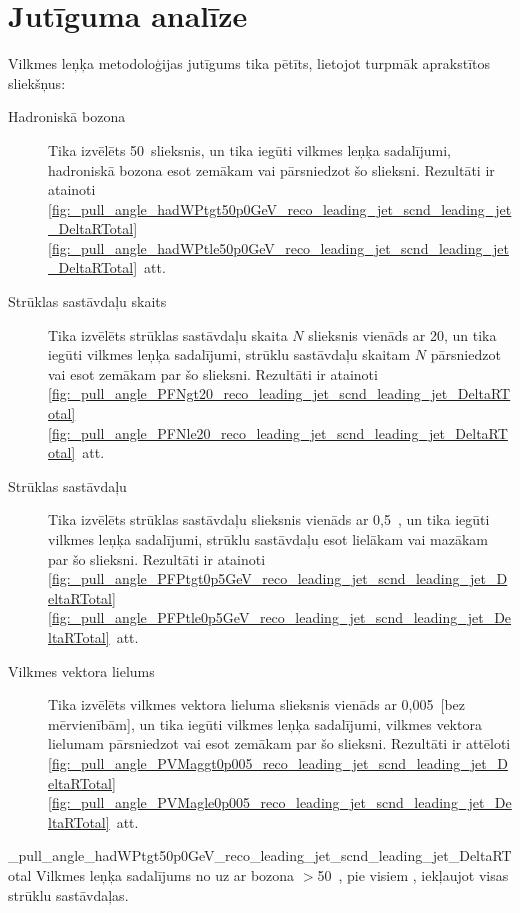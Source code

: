\section{Jutīguma analīze}

Vilkmes leņķa metodoloģijas jutīgums tika pētīts, lietojot turpmāk aprakstītos \gls{sliekšņus}:
\begin{description}
\item[Hadroniskā \PW bozona \pt] Tika izvēlēts 50~\GeV slieksnis, un tika iegūti vilkmes leņķa sadalījumi, hadroniskā \PW bozona \pt esot zemākam vai pārsniedzot šo slieksni. Rezultāti ir atainoti \ref{fig:_pull_angle_hadWPtgt50p0GeV_reco_leading_jet_scnd_leading_jet_DeltaRTotal}\textendash\ref{fig:_pull_angle_hadWPtle50p0GeV_reco_leading_jet_scnd_leading_jet_DeltaRTotal}~att.

\item[Strūklas sastāvdaļu skaits] Tika izvēlēts strūklas sastāvdaļu skaita $N$ slieksnis vienāds ar 20, un tika iegūti vilkmes leņķa sadalījumi, strūklu sastāvdaļu skaitam $N$ pārsniedzot vai esot zemākam par šo slieksni. Rezultāti ir atainoti \ref{fig:_pull_angle_PFNgt20_reco_leading_jet_scnd_leading_jet_DeltaRTotal}\textendash\ref{fig:_pull_angle_PFNle20_reco_leading_jet_scnd_leading_jet_DeltaRTotal}~att.
                                        
\item[Strūklas sastāvdaļu \pt] Tika izvēlēts strūklas sastāvdaļu \pt slieksnis vienāds ar 0,5~\GeV, un tika iegūti vilkmes leņķa sadalījumi, strūklu sastāvdaļu \pt esot lielākam vai mazākam par šo slieksni. Rezultāti ir atainoti \ref{fig:_pull_angle_PFPtgt0p5GeV_reco_leading_jet_scnd_leading_jet_DeltaRTotal}\textendash\ref{fig:_pull_angle_PFPtle0p5GeV_reco_leading_jet_scnd_leading_jet_DeltaRTotal}~att.

\item[Vilkmes vektora lielums] Tika izvēlēts vilkmes vektora lieluma slieksnis vienāds ar 0,005~[bez mērvienībām], un tika iegūti vilkmes leņķa sadalījumi, vilkmes vektora lielumam pārsniedzot vai esot zemākam par šo slieksni. Rezultāti ir attēloti \ref{fig:_pull_angle_PVMaggt0p005_reco_leading_jet_scnd_leading_jet_DeltaRTotal}\textendash\ref{fig:_pull_angle_PVMagle0p005_reco_leading_jet_scnd_leading_jet_DeltaRTotal}~att.
\end{description}

          {_pull_angle_hadWPtgt50p0GeV_reco_leading_jet_scnd_leading_jet_DeltaRTotal}
          {Vilkmes leņķa sadalījums no \leadingjet uz \scndleadingjet ar \PW bozona \pt$>$50~\GeV, pie visiem \DeltaR, iekļaujot visas strūklu sastāvdaļas.}

